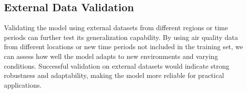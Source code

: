 \subsection{External Data Validation}
Validating the model using external datasets from different regions or time
periods can further test its generalization capability. By using air quality data
from different locations or new time periods not included in the training set,
we can assess how well the model adapts to new environments and varying
conditions. Successful validation on external datasets would indicate strong robustness
and adaptability, making the model more reliable for practical applications.